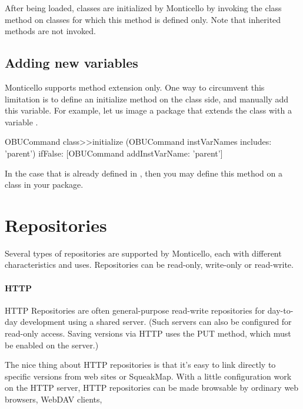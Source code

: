\documentclass[a4paper,10pt,twoside]{book}
\begin{document}
After being loaded, classes are initialized by Monticello by invoking the  class method on classes for which this method is defined only. Note that inherited  methods are not invoked.

\subsection{Adding new variables}

Monticello supports method extension only. One way to circumvent this limitation is to define an initialize method on the class side, and manually add this variable. For example, let us image  a package that extends the class  with a variable .

\begin{code}{}
OBUCommand class>>initialize
	(OBUCommand instVarNames includes: 'parent') 
		ifFalse: [OBUCommand addInstVarName: 'parent']
\end{code}

In the case that  is already defined in , then you may define this  method on a class in your package.

\section{Repositories}

Several types of repositories are supported by Monticello, each with different characteristics and uses. Repositories can be read-only, write-only or read-write.

\paragraph{HTTP} HTTP Repositories are often general-purpose read-write repositories for day-to-day  development using a shared server. (Such servers can also be configured for read-only access. Saving versions via HTTP uses the PUT method, which must be enabled on the server.)

The nice thing about HTTP repositories is that it's easy to link directly to specific versions from web sites or SqueakMap. With a little configuration work on the HTTP server, HTTP repositories can be made browsable by ordinary web browsers, WebDAV clients, \etc
\end{document}
